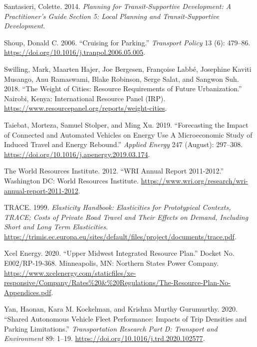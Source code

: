 \documentclass[
]{book}
\newlength{\cslhangindent}
\newlength{\cslentryspacingunit} %
\newenvironment{CSLReferences}[2] %
 {%
  \setlength{\parindent}{0pt}
  \ifodd #1
  \let\oldpar\par
  \def\par{\hangindent=\cslhangindent\oldpar}
  \fi
  \setlength{\parskip}{#2\cslentryspacingunit}
 }%
 {}
\begin{document}
\begin{CSLReferences}{1}{0}
\leavevmode{}%
Santasieri, Colette. 2014. \emph{Planning for {Transit-Supportive Development}: {A Practitioner}'s {Guide Section} 5: {Local Planning} and {Transit-Supportive Development}}.

\leavevmode{}%
Shoup, Donald C. 2006. {``Cruising for Parking.''} \emph{Transport Policy} 13 (6): 479--86. \url{https://doi.org/10.1016/j.tranpol.2006.05.005}.

\leavevmode{}%
Swilling, Mark, Maarten Hajer, Joe Bergesen, Françoise Labbé, Josephine Kaviti Musango, Anu Ramaswami, Blake Robinson, Serge Salat, and Sangwon Suh. 2018. {``The {Weight} of {Cities}: {Resource Requirements} of {Future Urbanization}.''} {Nairobi, Kenya}: {International Resource Panel (IRP)}. \url{https://www.resourcepanel.org/reports/weight-cities}.

\leavevmode{}%
Taiebat, Morteza, Samuel Stolper, and Ming Xu. 2019. {``Forecasting the {Impact} of {Connected} and {Automated Vehicles} on {Energy Use A Microeconomic Study} of {Induced Travel} and {Energy Rebound}.''} \emph{Applied Energy} 247 (August): 297--308. \url{https://doi.org/10.1016/j.apenergy.2019.03.174}.

\leavevmode{}%
The World Resources Institute. 2012. {``{WRI Annual Report} 2011-2012.''} {Washington DC}: {World Resources Institute}. \url{https://www.wri.org/research/wri-annual-report-2011-2012}.

\leavevmode{}%
TRACE. 1999. \emph{Elasticity Handbook: {Elasticities} for Prototypical Contexts, {TRACE}; Costs of Private Road Travel and Their Effects on Demand, Including Short and Long Term Elasticities}. \url{https://trimis.ec.europa.eu/sites/default/files/project/documents/trace.pdf}.

\leavevmode{}%
Xcel Energy. 2020. {``Upper {Midwest Integrated Resource Plan}.''} Docket No. E002/RP-19-368. {Minneapolis, MN}: {Northern States Power Company}. \url{https://www.xcelenergy.com/staticfiles/xe-responsive/Company/Rates\%20\&\%20Regulations/The-Resource-Plan-No-Appendices.pdf}.

\leavevmode{}%
Yan, Haonan, Kara M. Kockelman, and Krishna Murthy Gurumurthy. 2020. {``Shared Autonomous Vehicle Fleet Performance: {Impacts} of Trip Densities and Parking Limitations.''} \emph{Transportation Research Part D: Transport and Environment} 89: 1--19. \url{https://doi.org/10.1016/j.trd.2020.102577}.

\end{CSLReferences}
\end{document}
